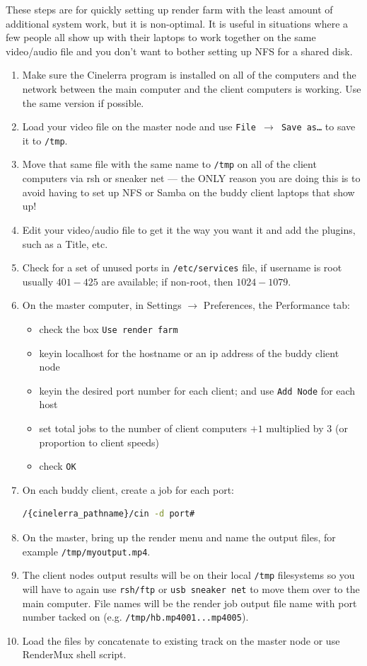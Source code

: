 These steps are for quickly setting up render farm with the least amount of additional system work, but it is non-optimal.  It is useful in situations where a few people all show up with their laptops to work together on the same video/audio file and you don’t want to bother setting up NFS for a shared disk.

\begin{enumerate}
    \item Make sure the Cinelerra program is installed on all of the computers and the network between the
    main computer and the client computers is working.  Use the same version if possible.
    \item Load your video file on the master node and use \texttt{File $\rightarrow$ Save as\dots}  to save it to \texttt{/tmp}.
    \item Move that same file with the same name to \texttt{/tmp} on all of the client computers via rsh or sneaker net --- the ONLY reason you are doing this is to avoid having to set up NFS or Samba on the buddy client
    laptops that show up!
    \item Edit your video/audio file to get it the way you want it and add the plugins, such as a Title, etc.
    \item Check for a set of unused ports in \texttt{/etc/services} file, if username is root usually $401-425$ are
    available; if non-root, then $1024-1079$.
    \item On the master computer, in Settings $\rightarrow$ Preferences, the Performance tab:
    \begin{itemize}
        \item check the box \texttt{Use render farm}
        \item keyin localhost for the hostname or an ip address of the buddy client node
        \item keyin the desired port number for each client; and use \texttt{Add Node} for each host
        \item set total jobs to the number of client computers $+1$ multiplied by $3$ (or proportion to client speeds)
        \item check \texttt{OK}
    \end{itemize}
    \item On each buddy client, create a job for each port:    
    \begin{lstlisting}[language=bash,numbers=none]
/{cinelerra_pathname}/cin -d port#
    \end{lstlisting}
    \item On the master, bring up the render menu and name the output files, for example \texttt{/tmp/myoutput.mp4}.
    \item The client nodes output results will be on their local \texttt{/tmp} filesystems so you will have to again use
    \texttt{rsh/ftp} or \texttt{usb sneaker net} to move them over to the main computer.  File names will be the render
    job output file name with port number tacked on (e.g. \texttt{/tmp/hb.mp4001...mp4005}).
    \item Load the files by concatenate to existing track on the master node or use RenderMux shell script.
\end{enumerate}


